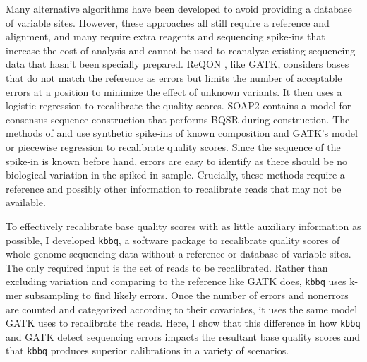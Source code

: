 Many alternative algorithms have been developed to avoid providing a database of variable sites. However, these approaches all still require a reference and alignment, and many require extra reagents and sequencing spike-ins that increase the cost of analysis and cannot be used to reanalyze existing sequencing data that hasn't been specially prepared.
ReQON \parencite{cabanski_reqon:_2012}, like GATK, considers bases that do not match the reference as errors but limits the number of acceptable errors at a position to minimize the effect of unknown variants. It then uses a logistic regression to recalibrate the quality scores.
SOAP2 \parencite{li_soap2:_2009} contains a model for consensus sequence construction that performs BQSR during construction. %
The methods of \cite{zook_synthetic_2012} and \cite{ni_improvement_2016} use synthetic spike-ins of known composition and GATK's model \parencite{zook_synthetic_2012} or piecewise regression \parencite{ni_improvement_2016} to recalibrate quality scores. Since the sequence of the spike-in is known before hand, errors are easy to identify as there should be no biological variation in the spiked-in sample.
Crucially, these methods require a reference and possibly other information to recalibrate reads that may not be available.

To effectively recalibrate base quality scores with as little auxiliary information as possible, I developed \texttt{kbbq}, a software package to recalibrate quality scores of whole genome sequencing data without a reference or database of variable sites. The only required input is the set of reads to be recalibrated. Rather than excluding variation and comparing to the reference like GATK does, \texttt{kbbq} uses k-mer subsampling to find likely errors. Once the number of errors and nonerrors are counted and categorized according to their covariates, it uses the same model GATK uses to recalibrate the reads. Here, I show that this difference in how \texttt{kbbq} and GATK detect sequencing errors impacts the resultant base quality scores and that \texttt{kbbq} produces superior calibrations in a variety of scenarios.

